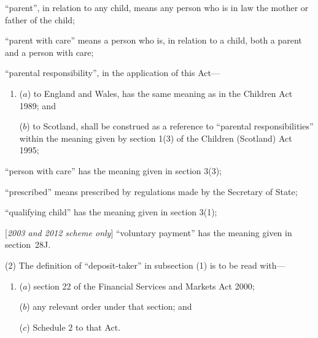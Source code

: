\documentclass[12pt,a4paper]{article}
\begin{document}
\begin{enumerate}
    “parent”, in relation to any child, means any person who is in law the mother or father of the child;

“parent with care” means a person who is, in relation to a child, both a parent and a person with care;


“parental responsibility”, in the application of this Act—
\begin{enumerate}\item[]
($a$) to England and Wales, has the same meaning as in the Children Act 1989; and

($b$) to Scotland, shall be construed as a reference to “parental responsibilities” within the meaning given by section 1(3) of the Children (Scotland) Act 1995;
\end{enumerate}


    “person with care” has the meaning given in section 3(3);

    “prescribed” means prescribed by regulations made by the Secretary of State;

    “qualifying child” has the meaning given in section 3(1);

[\emph{2003 and 2012 scheme only}] “voluntary payment” has the meaning given in section~28J.
\end{enumerate}

(2) The definition of “deposit-taker” in subsection (1) is to be read with—
\begin{enumerate}\item[]
($a$) section 22 of the Financial Services and Markets Act 2000;

($b$) any relevant order under that section; and

($c$) Schedule 2 to that Act.
\end{enumerate}
\end{document}

